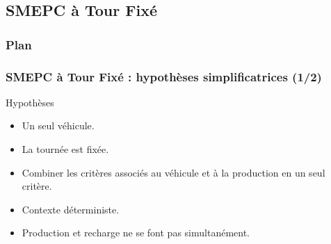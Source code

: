 \documentclass[hyperref={bookmarks=false},aspectratio=169]{beamer}
\begin{document}
\subsection{SMEPC à Tour Fixé}%
\begin{frame}
\frametitle{Plan}
\addtocounter{framenumber}{-1}
\end{frame}

\begin{frame}
\frametitle{SMEPC à Tour Fixé : hypothèses simplificatrices (1/2)}

\begin{block}{Hypothèses}
\begin{itemize}
\item Un seul véhicule.
\item La tournée est fixée.
\item Combiner les critères associés au véhicule et à la production en un
seul critère.
\item Contexte déterministe.
\item Production et recharge ne se font pas simultanément.
 \end{itemize}
 \end{block}
\end{frame}
\end{document}
